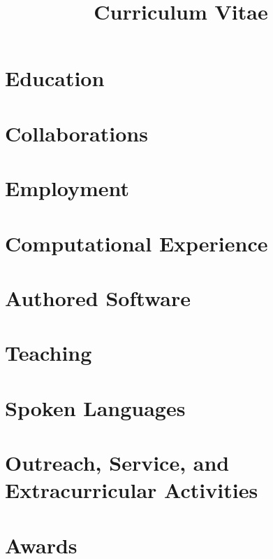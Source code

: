 \documentclass[10pt,letterpaper,roman]{moderncv} %
\title{Curriculum Vitae}
\begin{document}
% 
\makecvtitle %

\section{Education}


\section{Collaborations}


\section{Employment}


\section{Computational Experience}


\section{Authored Software}


\section{Teaching}


\section{Spoken Languages}


\section{Outreach, Service, and Extracurricular Activities}


\section{Awards}



\end{document}
